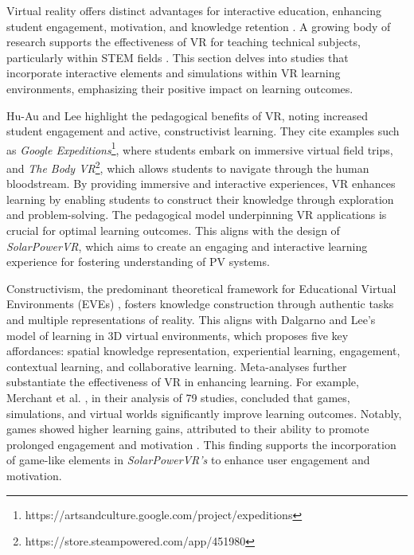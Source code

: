 \documentclass[draft, final]{vutinfth} %
\begin{document}
Virtual reality offers distinct advantages for interactive education, enhancing student engagement, motivation, and knowledge retention \cite{Dalgarno2010Learning, HuAu2018VrExperience, Lege2020VrProgress}. A growing body of research supports the effectiveness of VR for teaching technical subjects, particularly within STEM fields \cite{Merchant2014VrEffectiveness, Mikropoulos2011VrEducational}. This section delves into studies that incorporate interactive elements and simulations within VR learning environments, emphasizing their positive impact on learning outcomes.

Hu-Au and Lee \cite{HuAu2018VrExperience} highlight the pedagogical benefits of VR, noting increased student engagement and active, constructivist learning. They cite examples such as \textit{Google Expeditions}\footnote{https://artsandculture.google.com/project/expeditions}, where students embark on immersive virtual field trips, and \textit{The Body VR}\footnote{https://store.steampowered.com/app/451980}, which allows students to navigate through the human bloodstream. By providing immersive and interactive experiences, VR enhances learning by enabling students to construct their knowledge through exploration and problem-solving. The pedagogical model underpinning VR applications is crucial for optimal learning outcomes. This aligns with the design of \textit{SolarPowerVR}, which aims to create an engaging and interactive learning experience for fostering understanding of PV systems.

Constructivism, the predominant theoretical framework for Educational Virtual Environments (EVEs) \cite{Mikropoulos2011VrEducational}, fosters knowledge construction through authentic tasks and multiple representations of reality. This aligns with Dalgarno and Lee's \cite{Dalgarno2010Learning} model of learning in 3D virtual environments, which proposes five key affordances: spatial knowledge representation, experiential learning, engagement, contextual learning, and collaborative learning. Meta-analyses further substantiate the effectiveness of VR in enhancing learning. For example, Merchant et al. \cite{Merchant2014VrEffectiveness}, in their analysis of 79 studies, concluded that games, simulations, and virtual worlds significantly improve learning outcomes. Notably, games showed higher learning gains, attributed to their ability to promote prolonged engagement and motivation \cite{Gee2012Situated}. This finding supports the incorporation of game-like elements in \textit{SolarPowerVR's} to enhance user engagement and motivation.
\end{document}
